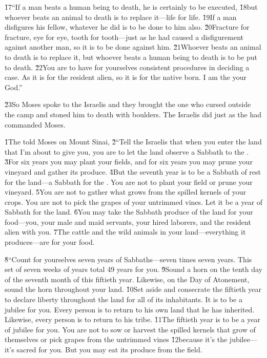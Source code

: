\v{17}``If a man beats a human being to death, he is certainly to be executed, \v{18}but whoever beats an animal to death is to replace it---life for life. \v{19}If a man disfigures his fellow, whatever he did is to be done to him also. \v{20}Fracture for fracture, eye for eye, tooth for tooth---just as he had caused a disfigurement against another man, so it is to be done against him. \v{21}Whoever beats an animal to death is to replace it, but whoever beats a human being to death is to be put to death. \v{22}You are to have for yourselves consistent procedures in deciding a case. As it is for the resident alien, so it is for the native born. I am the  your God.''

\v{23}So Moses spoke to the Israelis and they brought the one who cursed outside the camp and stoned him to death with boulders. The Israelis did just as the  had commanded Moses.

\v{1}The  told Moses on Mount Sinai, \v{2}``Tell the Israelis that when you enter the land that I'm about to give you, you are to let the land observe a Sabbath to the . \v{3}For six years you may plant your fields, and for six years you may prune your vineyard and gather its produce. \v{4}But the seventh year is to be a Sabbath of rest for the land---a Sabbath for the . You are not to plant your field or prune your vineyard. \v{5}You are not to gather what grows from the spilled kernels of your crops. You are not to pick the grapes of your untrimmed vines. Let it be a year of Sabbath for the land. \v{6}You may take the Sabbath produce of the land for your food---you, your male and maid servants, your hired laborers, and the resident alien with you. \v{7}The cattle and the wild animals in your land---everything it produces---are for your food.

\v{8}``Count for yourselves seven years of Sabbaths---seven times seven years. This set of seven weeks of years total 49 years for you. \v{9}Sound a horn on the tenth day of the seventh month of this fiftieth year. Likewise, on the Day of Atonement, sound the horn throughout your land. \v{10}Set aside and consecrate the fiftieth year to declare liberty throughout the land for all of its inhabitants. It is to be a jubilee for you. Every person is to return to his own land that he has inherited. Likewise, every person is to return to his tribe. \v{11}The fiftieth year is to be a year of jubilee for you. You are not to sow or harvest the spilled kernels that grow of themselves or pick grapes from the untrimmed vines \v{12}because it's the jubilee---it's sacred for you. But you may eat its produce from the field.

